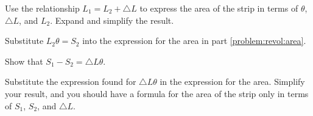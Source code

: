 \begin{problem}


\item Use the relationship $L_1 = L_2+\triangle L$ to express the area
  of the strip in terms of $\theta$, $\triangle L$, and  $L_2$.
  Expand and simplify the result.
  \label{problem:revol:area}
  \vfill
  \vfill

\item Substitute  $L_2\theta=S_2$  into the expression
  for the area in part \ref{problem:revol:area}.

  \vfill

\item Show that ${S_1-S_2}= \triangle L \theta$.

  \vfill


\item Substitute the expression found for $\triangle L \theta$ in the
  expression for the area. Simplify your result, and you should have a
  formula for the area of the strip only in terms of $S_1$, $S_2$, and
  $\triangle L$.

  \vfill



\end{problem}


